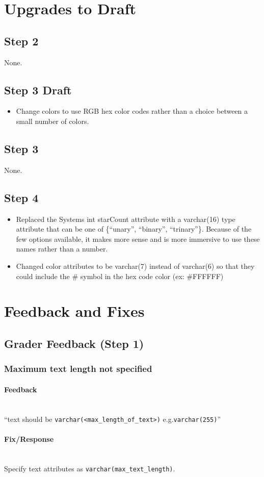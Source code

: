 \documentclass[12pt]{article}
\newcommand{\hparagraph}[1]{\paragraph{#1}\mbox{}\vspace{0.75em}\\}
\begin{document}
\newpage

\begin{appendices}
\section{Upgrades to Draft}

\subsection{Step 2}
None.

\subsection{Step 3 Draft}
\begin{itemize}
    \item Change colors to use RGB hex color codes rather than a choice between a small number of colors.
\end{itemize}

\subsection{Step 3}
None.

\subsection{Step 4}
\begin{itemize}
    \item Replaced the Systems int starCount attribute with a varchar(16) type attribute that can be one of \{“unary”, “binary”, “trinary”\}. Because of the few options available, it makes more sense and is more immersive to use these names rather than a number.
    \item Changed color attributes to be varchar(7) instead of varchar(6) so that they could include the \# symbol in the hex code color (ex: \#FFFFFF)
\end{itemize}

\newpage
\section{Feedback and Fixes}

\subsection{Grader Feedback (Step 1)}
\subsubsection{Maximum text length not specified}
\hparagraph{Feedback}
“text should be \texttt{varchar(<max\_length\_of\_text>)} e.g.\texttt{varchar(255)}”
\hparagraph{Fix/Response}
Specify text attributes as \texttt{varchar(max\_text\_length)}.


\end{appendices}
\end{document}
